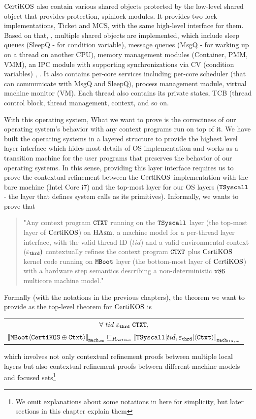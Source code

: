 $\mathrm{CertiKOS}$ also contain various shared objects protected by 
the low-level shared object that provides protection, spinlock modules.
It provides two lock implementations, Ticket and MCS, with the same high-level interface for them. 
Based on that, , 
multiple shared objects are implemented, which include
sleep queues (SleepQ - for condition variable), message queues (MsgQ - for warking up on a thread on another CPU), memory management modules (Container, PMM, VMM), an IPC module with supporting synchronizations via CV (condition variables) , \etc.  
It also contains per-core services including per-core scheduler (that can communicate with MsgQ and SleepQ), process management module,
virtual machine monitor (VM). 
Each thread also contains its private states, TCB (thread control block, thread management, context, and so on. 

With this operating system, 
What we want to prove is the correctness of our operating system's behavior with any context programs run on top of it.
We have built the operating systems in a layered structure to provide the highest level layer interface which hides most details of OS implementation and
works as a transition machine for the user programs that preserves the behavior of our operating systems.  
In this sense, providing this layer interface requires us 
to prove the contextual refinement between the $\mathrm{CertiKOS}$ implementation with the bare machine (Intel Core i7) and 
the top-most layer for our OS layers (${\mathrm{\texttt{TSyscall}}}$ - the layer that defines system calls as its primitives).
Informally, we wants to prove that
\begin{quote}
"Any context program ${\mathrm{\texttt{CTXT}}}$ running on the ${\mathrm{\texttt{TSyscall}}}$ layer (the top-most layer of $\mathrm{CertiKOS}$) on $\mathrm{HAsm}$, a machine model for a per-thread layer interface, with the valid thread ID ($tid$)
and a valid environmental context (${\varepsilon}_{{\mathrm{\texttt{thrd}}}})$ 
contextually refines the context program ${\mathrm{\texttt{CTXT}}}$ plus $\mathrm{CertiKOS}$ kernel code running on ${\mathrm{\texttt{MBoot}}}$ layer (the bottom-most layer of $\mathrm{CertiKOS}$) with a hardware step semantics describing a non-deterministic $\mathrm{x86}$ multicore machine model."
\end{quote}
Formally (with the notations in the previous chapters), the theorem we want to provide as the top-level theorem for $\mathrm{CertiKOS}$ is 
 \begin{center}
\begin{tabular}{c}
$\forall\ tid\   \oracle_{\codeinmath{thrd}}\ \codeinmath{CTXT},$\\
${[\![{{\mathrm{\texttt{MBoot}}}} \langle {{\mathrm{\texttt{CertiKOS}}} \oplus {\mathrm{\texttt{Ctxt}}}} \rangle]\!]}_{{\mathrm{\texttt{mach}}}_{{\mathrm{\texttt{x86}}}}} \sqsubseteq_{R_{{\mathrm{\texttt{certikos}}}}} {[\![{{\mathrm{\texttt{TSyscall}}}[tid, {\varepsilon}_{{\mathrm{\texttt{thrd}}}}]} \langle {{\mathrm{\texttt{Ctxt}}}} \rangle]\!]}_{{{\mathrm{\texttt{mach}}}_{\mathrm{HAsm}}}}$\\
\end{tabular}
\end{center}
which involves not only contextual refinement proofs between multiple local layers but also contextual refinement proofs between
different machine models and focused sets\footnote{We omit explanations about some notations in here for simplicity, but later sections in this chapter explain them}

